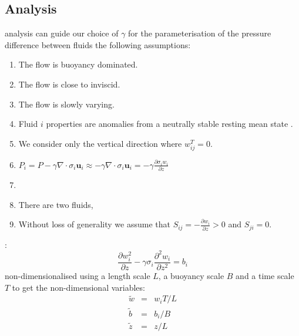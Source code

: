 \documentclass[draft]{agujournal2019}
\begin{document}

\subsection{\label{subsec:dimAnal}
 Analysis}

 analysis can guide our choice of $\gamma$ for the parameterisation of the pressure difference between fluids  the following assumptions:
\begin{enumerate}
\item The flow is buoyancy dominated.
\item The flow is close to inviscid.
\item The flow is slowly varying.
\item Fluid $i$ properties are anomalies from a neutrally stable resting
mean state 
.
\item We consider only the vertical direction where $w_{ij}^{T}=0$.
\item $P_{i}=P-\gamma\nabla\cdot\sigma_i \mathbf{u}_{i}\approx-\gamma\nabla\cdot\sigma_i\mathbf{u}_{i}=-\gamma\frac{\partial \sigma_i w_{i}}{\partial z}$
\item {}
\item There are two fluids, 
\item Without loss of generality we assume that $S_{ij}=-\frac{\partial w_{i}}{\partial z}>0$
and $S_{ji}=0$.
\end{enumerate}
:
\begin{equation}
\frac{\partial w_{i}^{2}}{\partial z}-\gamma\sigma_i\frac{\partial^{2}w_{i}}{\partial z^{2}}=b_{i}\label{eq:wi_balances}
\end{equation}
 non-dimensionalised using a length scale $L$, a buoyancy scale
$B$ and a time scale $T$ to get the non-dimensional variables:
\begin{eqnarray*}
\tilde{w} & = & w_{i}T/L\\
\tilde{b} & = & b_{i}/B\\
\tilde{z} & = & z/L
\end{eqnarray*}
\end{document}

